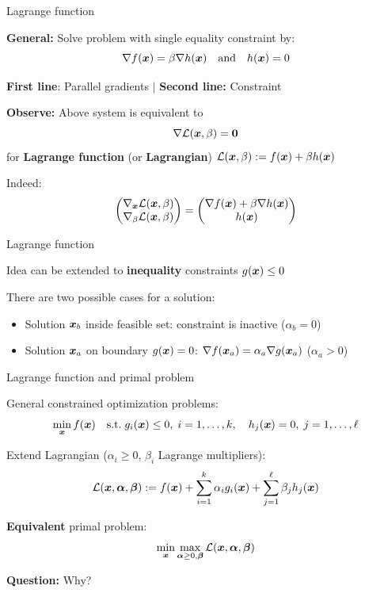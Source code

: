 \documentclass[11pt,compress,t,notes=noshow, xcolor=table]{beamer}
\begin{document}
\begin{framei}{Lagrange function}
\item \textbf{General:} Solve problem with single equality constraint by:
$$
\nabla f(\bm{x}) = \beta \nabla h(\bm{x}) \quad \text{and} \quad h(\bm{x}) = 0
$$
\item \textbf{First line}: Parallel gradients $|$ \textbf{Second line:} Constraint
\item \textbf{Observe:} Above system is equivalent to
$$
\nabla \mathcal{L}(\bm{x}, \beta) = \mathbf{0}
$$
for \textbf{Lagrange function} (or \textbf{Lagrangian}) $\mathcal{L}(\bm{x}, \beta) := f(\bm{x}) + \beta h(\bm{x})$
\item Indeed:
$$
\begin{pmatrix} 
\nabla_{\bm{x}} \mathcal{L}(\bm{x}, \beta) \\
\nabla_{\beta} \mathcal{L}(\bm{x}, \beta)
 \end{pmatrix}
= \begin{pmatrix} 
\nabla f(\bm{x}) + \beta \nabla h(\bm{x}) \\
h(\bm{x})
 \end{pmatrix}
$$
\end{framei}


\begin{framei}{Lagrange function}
\item Idea can be extended to \textbf{inequality} constraints $g(\bm{x}) \leq 0$
\item There are two possible cases for a solution:
\begin{itemize}
\item Solution $\bm{x}_b$ inside feasible set: constraint is inactive ($\alpha_b =0$)
\item Solution $\bm{x}_a$ on boundary $g(\bm{x}) = 0$: $\nabla f(\bm{x}_a) = \alpha_a \nabla g(\bm{x}_a)$ ($\alpha_a > 0$)
\end{itemize}
\end{framei}


\begin{framei}[fs=small]{Lagrange function and primal problem}
\item General constrained optimization problems:
$$
\min_{\bm{x}} f(\bm{x}) \quad
\text{s.t.} \; g_i(\bm{x}) \leq 0, \; i = 1, \ldots ,k, \quad
h_j(\bm{x}) = 0, \; j = 1, \ldots, \ell
$$
\item Extend Lagrangian ($\alpha_i\ge 0$, $\beta_i$ Lagrange multipliers):
$$
\mathcal{L}(\bm{x}, \bm{\alpha}, \bm{\beta}) := f(\bm{x}) + \sum_{i=1}^k \alpha_i g_i(\bm{x}) + \sum_{j=1}^\ell \beta_j h_j(\bm{x})
$$
\item \textbf{Equivalent} primal problem:
$$
\min_{\bm{x}} \max_{\bm{\alpha}\ge 0, \bm{\beta}}  \mathcal{L}(\bm{x}, \bm{\alpha}, \bm{\beta})
$$
\item \textbf{Question:} Why?
\end{framei}
\end{document}
